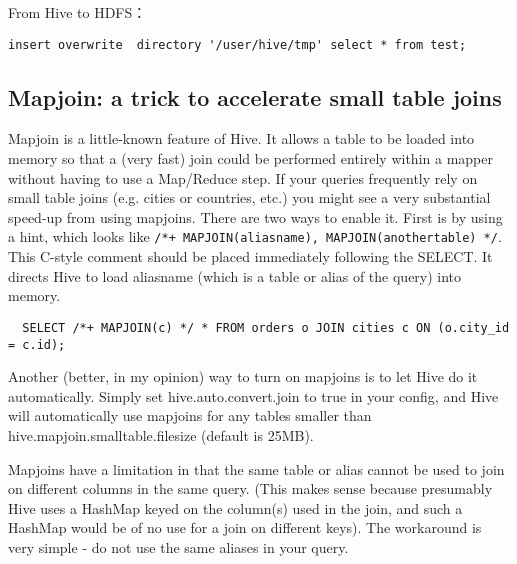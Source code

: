 From Hive to HDFS：
\begin{verbatim}
insert overwrite  directory '/user/hive/tmp' select * from test;
\end{verbatim}

\subsection{Mapjoin: a trick to accelerate small table joins}


  Mapjoin is a little-known feature of Hive. 
  It allows a table to be loaded into memory so that a (very fast) join could be performed entirely within a mapper without having to use a Map/Reduce step. 
  If your queries frequently rely on small table joins (e.g. cities or countries, etc.) you might see a very substantial speed-up from using mapjoins.
There are two ways to enable it. 
First is by using a hint, which looks like \verb$/*+ MAPJOIN(aliasname), MAPJOIN(anothertable) */$. 
This C-style comment should be placed immediately following the SELECT. 
It directs Hive to load aliasname (which is a table or alias of the query) into memory.


\begin{verbatim}
  SELECT /*+ MAPJOIN(c) */ * FROM orders o JOIN cities c ON (o.city_id = c.id);
\end{verbatim}

Another (better, in my opinion) way to turn on mapjoins is to let Hive do it automatically.
 Simply set hive.auto.convert.join to true in your config, 
 and Hive will automatically use mapjoins for any tables smaller than hive.mapjoin.smalltable.filesize (default is 25MB).

Mapjoins have a limitation in that the same table or alias cannot be used to join on different columns in the same query. 
(This makes sense because presumably Hive uses a HashMap keyed on the column(s) used in the join, and such a HashMap would be of no use for a join on different keys).
The workaround is very simple - do not use the same aliases in your query.

